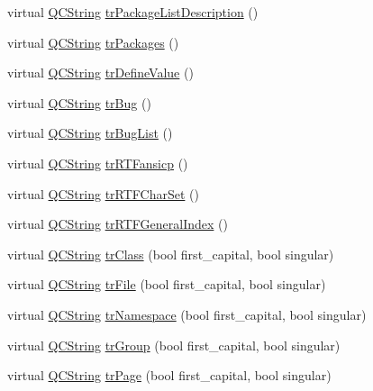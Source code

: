 \begin{DoxyCompactItemize}
virtual \hyperlink{class_q_c_string}{Q\-C\-String} \hyperlink{class_translator_portuguese_aafd776ddbb24f5b3cf7c2f39c80f8652}{tr\-Package\-List\-Description} ()
\item 
virtual \hyperlink{class_q_c_string}{Q\-C\-String} \hyperlink{class_translator_portuguese_a5b648094fc927e3078e9af28c26f8bba}{tr\-Packages} ()
\item 
virtual \hyperlink{class_q_c_string}{Q\-C\-String} \hyperlink{class_translator_portuguese_ae6be6e403011f5b069dde07447839f9e}{tr\-Define\-Value} ()
\item 
virtual \hyperlink{class_q_c_string}{Q\-C\-String} \hyperlink{class_translator_portuguese_abfa1d6c97f4c2967ebbd515db5590ec6}{tr\-Bug} ()
\item 
virtual \hyperlink{class_q_c_string}{Q\-C\-String} \hyperlink{class_translator_portuguese_a6922767c9b6ff214503967c6f8b66468}{tr\-Bug\-List} ()
\item 
virtual \hyperlink{class_q_c_string}{Q\-C\-String} \hyperlink{class_translator_portuguese_ac711f1a109c3c8131bf02a9ff6f48e36}{tr\-R\-T\-Fansicp} ()
\item 
virtual \hyperlink{class_q_c_string}{Q\-C\-String} \hyperlink{class_translator_portuguese_af3bba50fd4e382b113171e132e88719b}{tr\-R\-T\-F\-Char\-Set} ()
\item 
virtual \hyperlink{class_q_c_string}{Q\-C\-String} \hyperlink{class_translator_portuguese_a6a04ffa0f1114981e258cf0a94478c98}{tr\-R\-T\-F\-General\-Index} ()
\item 
virtual \hyperlink{class_q_c_string}{Q\-C\-String} \hyperlink{class_translator_portuguese_a2b5bc0be4e846d4ee6e3430ddeb3cf53}{tr\-Class} (bool first\-\_\-capital, bool singular)
\item 
virtual \hyperlink{class_q_c_string}{Q\-C\-String} \hyperlink{class_translator_portuguese_abb09819793310c18e4b39a4691b8e681}{tr\-File} (bool first\-\_\-capital, bool singular)
\item 
virtual \hyperlink{class_q_c_string}{Q\-C\-String} \hyperlink{class_translator_portuguese_a5e5011ab1245fd64707347dae129c574}{tr\-Namespace} (bool first\-\_\-capital, bool singular)
\item 
virtual \hyperlink{class_q_c_string}{Q\-C\-String} \hyperlink{class_translator_portuguese_a2825eb7956ddf759028c8957352e627d}{tr\-Group} (bool first\-\_\-capital, bool singular)
\item 
virtual \hyperlink{class_q_c_string}{Q\-C\-String} \hyperlink{class_translator_portuguese_a719e433b483932299fd17e751decdfb2}{tr\-Page} (bool first\-\_\-capital, bool singular)

\end{DoxyCompactItemize}
